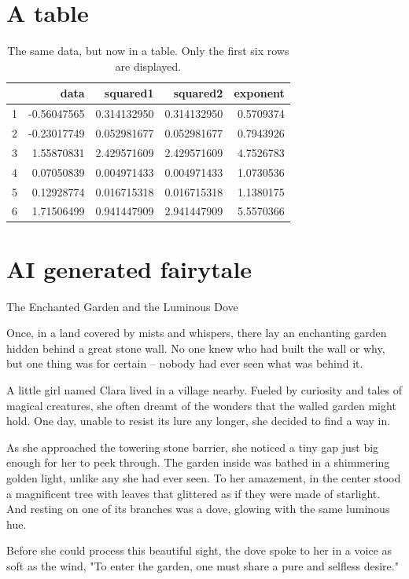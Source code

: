 \documentclass[10pt, fullpage, a4paper, titlepage]{article}
\begin{document}
\section{A table}
\begin{table}[h!]
	\centering
	\caption{The same data, but now in a table. Only the first six rows are displayed.}
	\begin{tabular}{rrrrr}
  		\hline
		 & data & squared1 & squared2 & exponent \\ 
		\hline
		1 & -0.56047565 & 0.314132950 & 0.314132950 & 0.5709374 \\ 
  		2 & -0.23017749 & 0.052981677 & 0.052981677 & 0.7943926 \\
		3 & 1.55870831  & 2.429571609 & 2.429571609 & 4.7526783 \\
  		4 & 0.07050839  & 0.004971433 & 0.004971433 & 1.0730536 \\
  		5 & 0.12928774  & 0.016715318 & 0.016715318 & 1.1380175 \\
  		6 & 1.71506499  & 0.941447909 & 2.941447909 & 5.5570366 \\
		\hline
	\end{tabular}
\end{table}

\newpage
\section{AI generated fairytale}
The Enchanted Garden and the Luminous Dove

Once, in a land covered by mists and whispers, there lay an enchanting garden hidden behind a great stone wall. No one knew who had built the wall or why, but one thing was for certain – nobody had ever seen what was behind it.

A little girl named Clara lived in a village nearby. Fueled by curiosity and tales of magical creatures, she often dreamt of the wonders that the walled garden might hold. One day, unable to resist its lure any longer, she decided to find a way in.

As she approached the towering stone barrier, she noticed a tiny gap just big enough for her to peek through. The garden inside was bathed in a shimmering golden light, unlike any she had ever seen. To her amazement, in the center stood a magnificent tree with leaves that glittered as if they were made of starlight. And resting on one of its branches was a dove, glowing with the same luminous hue.

Before she could process this beautiful sight, the dove spoke to her in a voice as soft as the wind, "To enter the garden, one must share a pure and selfless desire."
\end{document}
